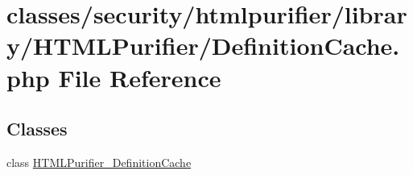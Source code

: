 \hypertarget{DefinitionCache_8php}{\section{classes/security/htmlpurifier/library/\+H\+T\+M\+L\+Purifier/\+Definition\+Cache.php File Reference}
\label{DefinitionCache_8php}
}
\subsection*{Classes}
\begin{DoxyCompactItemize}
\item 
class \hyperlink{classHTMLPurifier__DefinitionCache}{H\+T\+M\+L\+Purifier\+\_\+\+Definition\+Cache}
\end{DoxyCompactItemize}
